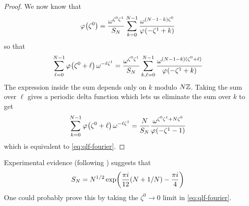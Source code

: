 \documentclass{sl2ams}
\numberwithin{equation}{section}
\begin{document}
\begin{proof}
  We now know that
  \[
    \pf{\zeta^{0}} 
    =
    \frac{
      \omega^{\zeta^{0} \zeta^{1}}
    }{
      S_{\nr}
    }
    \sum_{k=0}^{\nr-1}
    \frac{
      \omega^{(\nr - 1 -k) \zeta^{0}}
      }{
      \pf{-\zeta^{1} + k} 
    }
  \]
  so that
  \[
    \sum_{\ell = 0}^{\nr-1}
    \pf{\zeta^{0} + \ell}
    \omega^{-\ell \zeta^{1}}
    =
    \frac{
      \omega^{\zeta^{0} \zeta^{1}}
    }{
      S_{\nr}
    }
    \sum_{k,\ell=0}^{\nr-1}
    \frac{
      \omega^{(\nr - 1 -k) (\zeta^{0} + \ell)}
      }{
      \pf{-\zeta^{1} + k} 
    }
  \]
  The expression inside the sum depends only on \(k\) modulo \(N \mathbb{Z}\).
  Taking the sum over \(\ell\) gives a periodic delta function which lets us eliminate the sum over \(k\) to get
  \begin{equation}
    \sum_{k=0}^{\nr-1}
    \pf{\zeta^{0} + \ell}
    \omega^{-\ell \zeta^{1}}
    =
    \frac{
      \nr
      }{
      S_{\nr}
    }
    \frac{
      \omega^{\zeta^{0} \zeta^{1} + \nr \zeta^{0}}
      }{
      \pf{-\zeta^{1} - 1}
    }
  \end{equation}  
  which is equivalent to \eqref{eq:qlf-fourier}.
\end{proof}

\begin{remark}
  Experimental evidence (following \cite[eq.\ (C.5)]{Kashaev1993}) suggests that
  \[
    S_{N}
    =
    N^{1/2}
    \exp \mathopen{}\left( \frac{\pi i}{12} ( N + 1/N) - \frac{\pi i}{4} \right)
  \]
  One could probably prove this by taking the \(\zeta^{0} \to 0\) limit in \eqref{eq:qlf-fourier}.
\end{remark}
\end{document}
